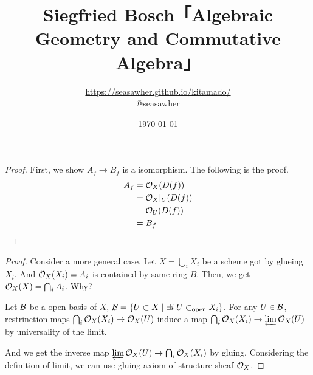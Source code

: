 \documentclass[10pt]{jsarticle}
\begin{document}
\title{Siegfried Bosch「Algebraic Geometry and Commutative Algebra」}
\author{\url{https://seasawher.github.io/kitamado/} \\ @seasawher}
\date{\today}
\maketitle


\begin{proof}
  First, we show $A_f \to B_f$ is a isomorphism. The following is the proof.
  \begin{align*}
    A_f &= \mathcal{O}_X(D(f)) \\
    &= \mathcal{O}_X|_U(D(f)) \\
    &= \mathcal{O}_U(D(f)) \\
    &= B_f
  \end{align*}
\end{proof}


\begin{proof}
  Consider a more general case. Let $X = \bigcup_i X_i$ be a scheme got by glueing $X_i$. And $\mathcal{O}_X(X_i) = A_i$ is contained by same ring $B$.
  Then, we get $\mathcal{O}_X(X) = \bigcap_i A_i$. Why?

  Let $\mathcal{B}$ be a open basis of $X$, $\mathcal{B} = \left\{ U \subset X \mathrel{} \middle| \mathrel{} \exists i \;  U \subset_{\text{open}} X_i \right\}$. For any $U \in \mathcal{B}$, restrinction maps $\bigcap_i \mathcal{O}_X(X_i) \to \mathcal{O}_X(U)$ induce a map $\bigcap_i \mathcal{O}_X(X_i) \to \operatorname*{\varprojlim} \mathcal{O}_X (U)$ by universality of the limit.

  And we get the inverse map $ \operatorname*{\varprojlim} \mathcal{O}_X (U) \to \bigcap_i \mathcal{O}_X(X_i) $ by gluing. Considering the definition of  limit, we can use gluing axiom of structure sheaf $\mathcal{O}_X$.
\end{proof}
\end{document}
